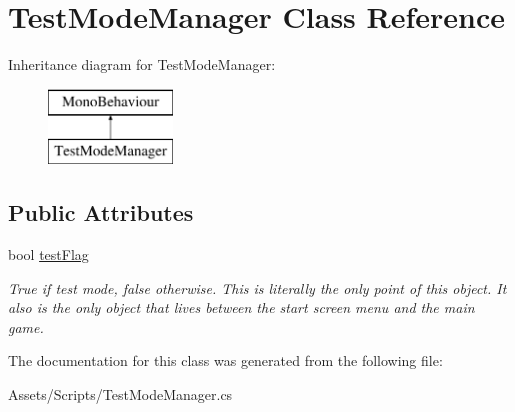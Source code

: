\hypertarget{class_test_mode_manager}{}\section{Test\+Mode\+Manager Class Reference}
\label{class_test_mode_manager}
Inheritance diagram for Test\+Mode\+Manager\+:\begin{figure}[H]
\begin{center}
\leavevmode
\includegraphics[height=2.000000cm]{class_test_mode_manager}
\end{center}
\end{figure}
\subsection*{Public Attributes}
\begin{DoxyCompactItemize}
\item 
\mbox{\label{class_test_mode_manager_a0aee28083cd1d83acd5f8de6500e660e}} 
bool \mbox{\hyperlink{class_test_mode_manager_a0aee28083cd1d83acd5f8de6500e660e}{test\+Flag}}
\begin{DoxyCompactList}\small\item\em True if test mode, false otherwise. This is literally the only point of this object. It also is the only object that lives between the start screen menu and the main game. \end{DoxyCompactList}\end{DoxyCompactItemize}


The documentation for this class was generated from the following file\+:\begin{DoxyCompactItemize}
\item 
Assets/\+Scripts/Test\+Mode\+Manager.\+cs\end{DoxyCompactItemize}
